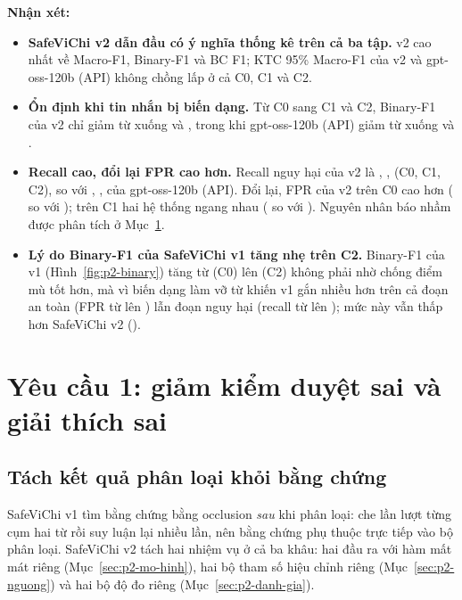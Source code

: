 \textbf{Nhận xét:}
\begin{itemize}
  \item \textbf{SafeViChi v2 dẫn đầu có ý nghĩa thống kê trên cả ba tập.} v2 cao nhất về Macro-F1, Binary-F1 và BC F1;
        KTC 95\% Macro-F1 của v2 và gpt-oss-120b (API) không chồng lấp ở cả C0, C1 và C2.
  \item \textbf{Ổn định khi tin nhắn bị biến dạng.} Từ C0 sang C1 và C2, Binary-F1 của v2 chỉ giảm từ 
        xuống  và , trong khi gpt-oss-120b (API) giảm từ  xuống
         và .
  \item \textbf{Recall cao, đổi lại FPR cao hơn.} Recall nguy hại của v2 là , , 
        (C0, C1, C2), so với , ,  của gpt-oss-120b (API). Đổi lại, FPR của v2 trên
        C0 cao hơn ( so với ); trên C1 hai hệ thống ngang nhau ( so với
        ). Nguyên nhân báo nhầm được phân tích ở Mục~\ref{sec:p2-yc1}.
  \item \textbf{Lý do Binary-F1 của SafeViChi v1 tăng nhẹ trên C2.} Binary-F1 của v1 (Hình~\ref{fig:p2-binary}) tăng từ
         (C0) lên  (C2) không phải nhờ chống điểm mù tốt hơn, mà vì biến dạng làm vỡ từ khiến
        v1 gắn  nhiều hơn trên cả đoạn an toàn (FPR từ  lên ) lẫn đoạn nguy hại
        (recall từ  lên ); mức này vẫn thấp hơn SafeViChi v2 ().
\end{itemize}

\section{Yêu cầu 1: giảm kiểm duyệt sai và giải thích sai}
\label{sec:p2-yc1}

\subsection{Tách kết quả phân loại khỏi bằng chứng}

SafeViChi v1 tìm bằng chứng bằng occlusion \emph{sau} khi phân loại: che lần lượt từng cụm hai từ rồi suy luận lại nhiều
lần, nên bằng chứng phụ thuộc trực tiếp vào bộ phân loại. SafeViChi v2 tách hai nhiệm vụ ở cả ba khâu: hai đầu ra với hàm mất mát riêng (Mục~\ref{sec:p2-mo-hinh}), hai bộ tham số hiệu chỉnh riêng
(Mục~\ref{sec:p2-nguong}) và hai bộ độ đo riêng (Mục~\ref{sec:p2-danh-gia}).

